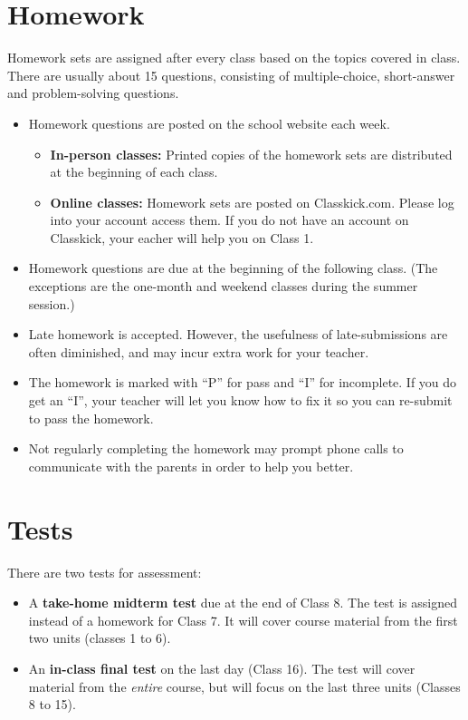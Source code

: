 \documentclass{../oss-handout}
\begin{document}
\section*{Homework}
Homework sets are assigned after every class based on the topics covered in
class. There are usually about 15 questions, consisting of multiple-choice,
short-answer and problem-solving questions.
\begin{itemize}[nosep]
\item Homework questions are posted on the school website each week.
  \begin{itemize}
  \item\textbf{In-person classes:} Printed copies of the homework sets are
    distributed at the beginning of each class.
  \item\textbf{Online classes:} Homework sets are posted on Classkick.com.
    Please log into your account access them. If you do not have an account on
    Classkick, your eacher will help you on Class 1.
  \end{itemize}
\item Homework questions are due at the beginning of the following class. (The
  exceptions are the one-month and weekend classes during the summer session.)
\item Late homework is accepted. However, the usefulness of late-submissions
  are often diminished, and may incur extra work for your teacher.
\item The homework is marked with ``P'' for pass and ``I'' for incomplete. If
  you do get an ``I'', your teacher will let you know how to fix it so you can
  re-submit to pass the homework.
\item Not regularly completing the homework may prompt phone calls to
  communicate with the parents in order to help you better.
\end{itemize}


\section*{Tests}
There are two tests for assessment:
\begin{itemize}[nosep]
\item A \textbf{take-home midterm test} due at the end of Class 8. The test is
  assigned instead of a homework for Class 7. It will cover course material
  from the first two units (classes 1 to 6).
\item An \textbf{in-class final test} on the last day (Class 16). The test will
  cover material from the \emph{entire} course, but will focus on the last
  three units (Classes 8 to 15).
\end{itemize}
\end{document}
